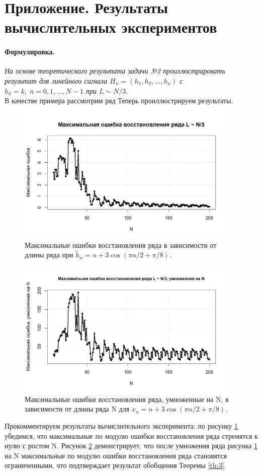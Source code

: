 \documentclass[specialist,
substylefile = spbu_report.rtx,
subf,href,colorlinks=true, 12pt]{disser}
\newenvironment{formulation}{\paragraph{Формулировка.}}{\hfill}
\begin{document}
	\section{Приложение. Результаты вычислительных экспериментов}
	\begin{formulation}
		\textit{На основе теоретического результата задачи №2 проиллюстрировать результат для линейного сигнала $H_n = (h_1, h_2, \dots, h_n)$ с $h_k = k,\;n=0,1,\dots,N-1$ при $L\sim N/3$.}
	\end{formulation}\\
	В качестве примера рассмотрим ряд
	Теперь проиллюстрируем результаты.
	\begin{figure}[!h]
		\includegraphics[width=0.95\textwidth]{Pictures/MERNoN.png}
		\caption{Максимальные ошибки восстановления ряда в зависимости от длины ряда при $\widetilde{h}_n = n + 3\cos(\pi n/2 + \pi/8)$.}\label{pic:1}
	\end{figure}
	\begin{figure}[!h]
		\includegraphics[width=0.95\textwidth]{Pictures/MERN.png}
		\caption{Максимальные ошибки восстановления ряда, умноженные на N, в зависимости от длины ряда N для $x_n = n + 3\cos(\pi n/2 + \pi/8)$.}\label{pic:2}
	\end{figure}
	\clearpage
	Прокомментируем результаты вычислительного эксперимента: по рисунку \ref{pic:1} убедимся, что максимальные по модулю ошибки восстановления ряда стремятся к нулю с ростом N. Рисунок \ref{pic:2} демонстрирует, что после умножения ряда рисунка \ref{pic:1} на N максимальные по модулю ошибки восстановления ряда становятся ограниченными, что подтверждает результат обобщения Теоремы \ref{th:3}.
\end{document}
